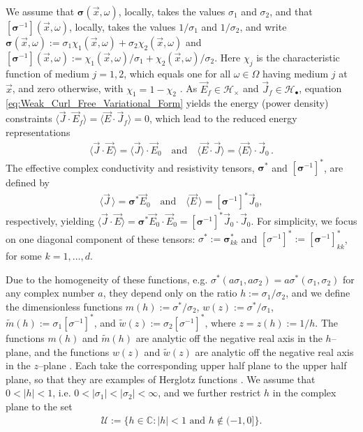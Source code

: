 \documentclass[english,12pt,jmp,graphicx]{revtex4-1}
\begin{document}
We assume that $\bm{\sigma}(\vec{x},\omega)$, locally, takes the values $\sigma_1$
and $\sigma_2$, and that $[\bm{\sigma}^{-1}](\vec{x},\omega)$, locally, takes the
values $1/\sigma_1$ and $1/\sigma_2$, and write 
$\bm{\sigma}(\vec{x},\omega):=\sigma_1\chi_1(\vec{x},\omega)+\sigma_2\chi_2(\vec{x},\omega)$ and
$[\bm{\sigma}^{-1}](\vec{x},\omega):=\chi_1(\vec{x},\omega)/\sigma_1+\chi_2(\vec{x},\omega)/\sigma_2$.
Here $\chi_j$ is the characteristic function of medium $j=1,2$, which
equals one for all $\omega\in\Omega$ having medium $j$ at $\vec{x}$, and zero
otherwise, with $\chi_1=1-\chi_2$ \cite{Golden:CMP-473}. As
$\vec{E}_f\in\mathscr{H}_\times$ and $\vec{J}_f\in\mathscr{H}_{\bullet}$, equation
\eqref{eq:Weak_Curl_Free_Variational_Form}
yields the energy (power density) constraints
$\langle\vec{J}\cdot\vec{E}_f\rangle=\langle\vec{E}\cdot\vec{J}_f\rangle=0$, which lead to the
reduced energy representations   
%
\begin{align}\label{eq:Reduced_System_Energy_Representations}
  \langle\vec{J}\cdot\vec{E}\rangle=\langle\vec{J}\rangle\cdot\vec{E}_0 \quad \text{and} \quad
  \langle\vec{E}\cdot\vec{J}\rangle=\langle\vec{E}\rangle\cdot\vec{J}_0\,.
\end{align}
%
The effective complex conductivity and resistivity tensors, $\bm{\sigma}^*$
and $[\bm{\sigma}^{-1}]^*$, are defined by  
%
\begin{align}\label{eq:eff_eps_def}
    \langle \vec{J} \,\rangle=  \bm{\sigma}^* \vec{E}_0 \quad \text{and} \quad
    \langle \vec{E} \,\rangle=  [\bm{\sigma}^{-1}]^*\vec{J}_0,
\end{align}
%
respectively, yielding
$\langle\vec{J}\cdot\vec{E}\rangle=\bm{\sigma}^*\vec{E}_0\cdot\vec{E}_0=[\bm{\sigma}^{-1}]^*\vec{J}_0\cdot\vec{J}_0$. For 
simplicity, we focus on one diagonal component of 
these
tensors: $\sigma^*:=\bm{\sigma}^*_{kk}$ and
$[\sigma^{-1}]^*:=[\bm{\sigma}^{-1}]^*_{kk}$, for some $k=1,\ldots,d$.

Due to the homogeneity of these functions, e.g.
$\sigma^*(a\sigma_1,a\sigma_2)=a\sigma^*(\sigma_1,\sigma_2)$ for any complex number $a$,
they depend only on the ratio $h:=\sigma_1/\sigma_2$, and we define the
dimensionless functions $m(h):=\sigma^*/\sigma_2$, $w(z):=\sigma^*/\sigma_1$,
$\tilde{m}(h):=\sigma_1[\sigma^{-1}]^*$, and $\tilde{w}(z):=\sigma_2[\sigma^{-1}]^*$, where 
$z=z(h):=1/h$. The functions $m(h)$ and $\tilde{m}(h)$ are analytic off the
negative real axis in the $h$--plane, and the functions $w(z)$ and
$\tilde{w}(z)$ are analytic off the negative real axis in the
$z$--plane \cite{Golden:CMP-473}. Each take the corresponding upper
half plane to the upper half plane, so that they are examples of 
Herglotz functions \cite{Golden:CMP-473}. We assume that $0<|h|<1$,
i.e. $0<|\sigma_1|<|\sigma_2|<\infty$, and we further restrict $h$ in the complex
plane to the set
%
\begin{align}\label{eq:h_Domain}
  \mathcal{U}:=\{h\in\mathbb{C}: |h|<1 \text{ and } h\not\in(-1,0]\}.
\end{align}
%
\end{document}
